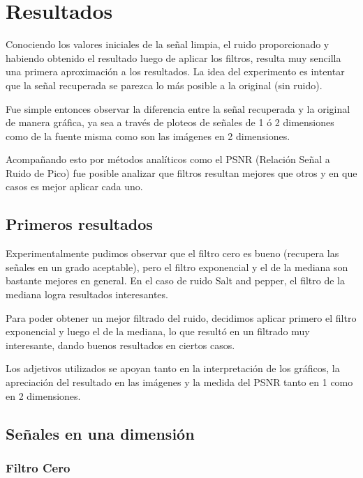 \section{Resultados}

Conociendo los valores iniciales de la se\~nal limpia, el ruido proporcionado y
habiendo obtenido el resultado luego de aplicar los filtros, resulta muy
sencilla una primera aproximaci\'on a los resultados. La idea del experimento es
intentar que la se\~nal recuperada se parezca lo m\'as posible a la original
(sin ruido).

Fue simple entonces observar la diferencia entre la se\~nal recuperada y
la original de manera gr\'afica, ya sea a trav\'es de ploteos de se\~nales de 1
\'o 2 dimensiones como de la fuente misma como son las im\'agenes en 2
dimensiones.

Acompa\~nando esto por m\'etodos anal\'iticos como el PSNR (Relaci\'on Se\~nal a
Ruido de Pico) fue posible analizar que filtros resultan mejores que otros y en
que casos es mejor aplicar cada uno.

\subsection{Primeros resultados}

Experimentalmente pudimos observar que el filtro cero es bueno (recupera las
se\~nales en un grado aceptable), pero el filtro 
exponencial y el de la mediana son bastante mejores en general. En el caso
de ruido Salt and pepper, el filtro de la mediana logra resultados interesantes.

Para poder obtener un mejor filtrado del ruido, decidimos aplicar primero el 
filtro exponencial y luego el de la mediana, lo que result\'o en un filtrado muy 
interesante, dando buenos resultados en ciertos casos. 

Los adjetivos utilizados se apoyan tanto en la interpretaci\'on de los gr\'aficos,
la apreciaci\'on del resultado en las im\'agenes y la medida del PSNR tanto en 1 como en 2
dimensiones. 

\subsection{Se\~nales en una dimensi\'on}

\subsubsection{Filtro Cero}

